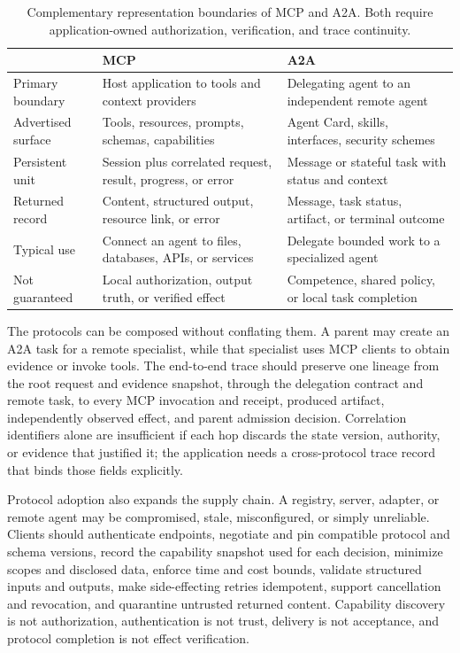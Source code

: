 \begin{table}[H]
\centering
\caption{Complementary representation boundaries of MCP and A2A. Both require application-owned authorization, verification, and trace continuity.}
\label{tab:protocols}
\small
\surveytableformat
\begin{tabularx}{\textwidth}{L{2cm}Y Y}
\toprule
 & \textbf{MCP} & \textbf{A2A} \\
\midrule
Primary boundary & Host application to tools and context providers & Delegating agent to an independent remote agent \\
Advertised surface & Tools, resources, prompts, schemas, capabilities & Agent Card, skills, interfaces, security schemes \\
Persistent unit & Session plus correlated request, result, progress, or error & Message or stateful task with status and context \\
Returned record & Content, structured output, resource link, or error & Message, task status, artifact, or terminal outcome \\
Typical use & Connect an agent to files, databases, APIs, or services & Delegate bounded work to a specialized agent \\
Not guaranteed & Local authorization, output truth, or verified effect & Competence, shared policy, or local task completion \\
\bottomrule
\end{tabularx}
\end{table}

The protocols can be composed without conflating them. A parent may create an A2A task for a remote specialist, while that specialist uses MCP clients to obtain evidence or invoke tools. The end-to-end trace should preserve one lineage from the root request and evidence snapshot, through the delegation contract and remote task, to every MCP invocation and receipt, produced artifact, independently observed effect, and parent admission decision. Correlation identifiers alone are insufficient if each hop discards the state version, authority, or evidence that justified it; the application needs a cross-protocol trace record that binds those fields explicitly.

Protocol adoption also expands the supply chain. A registry, server, adapter, or remote agent may be compromised, stale, misconfigured, or simply unreliable. Clients should authenticate endpoints, negotiate and pin compatible protocol and schema versions, record the capability snapshot used for each decision, minimize scopes and disclosed data, enforce time and cost bounds, validate structured inputs and outputs, make side-effecting retries idempotent, support cancellation and revocation, and quarantine untrusted returned content. Capability discovery is not authorization, authentication is not trust, delivery is not acceptance, and protocol completion is not effect verification.


